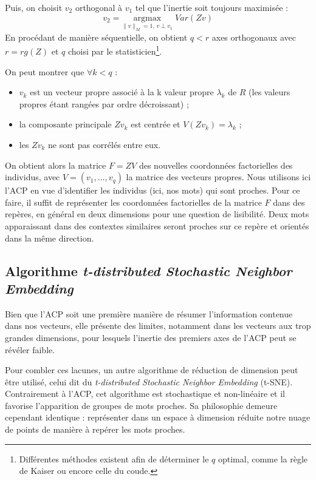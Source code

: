 \documentclass[11pt,french,french]{article}
\providecommand{\tightlist}{%
  \setlength{\parskip}{0pt}
  }
\let\rmarkdownfootnote\footnote%
\def\footnote{\protect\rmarkdownfootnote}
\begin{document}
Puis, on choisit \(v_2\) orthogonal à \(v_1\) tel que l'inertie soit
toujours maximisée : \[
v_2 =\underset{ \| v \|_M = 1,\,v \perp v_1}{\mathrm{argmax}}\;  Var(Zv)
\] En procédant de manière séquentielle, on obtient \(q < r\) axes
orthogonaux avec \(r = rg(Z)\) et \(q\) choisi par le
statisticien\footnote{Différentes méthodes existent afin de déterminer
  le \(q\) optimal, comme la règle de Kaiser ou encore celle du coude.}.

On peut montrer que \(\forall k < q\) :

\begin{itemize}
\tightlist
\item
  \(v_k\) est un vecteur propre associé à la k\ieme{} valeur propre
  \(\lambda_k\) de \(R\) (les valeurs propres étant rangées par ordre
  décroissant) ;
\item
  la composante principale \(Zv_k\) est centrée et
  \(V(Zv_k)= \lambda_k\) ;
\item
  les \(Zv_k\) ne sont pas corrélés entre eux.
\end{itemize}

On obtient alors la matrice \(F = ZV\) des nouvelles coordonnées
factorielles des individus, avec \(V = (v_1,\dots,v_q)\) la matrice des
vecteurs propres. Nous utilisons ici l'ACP en vue d'identifier les
individus (ici, nos mots) qui sont proches. Pour ce faire, il suffit de
représenter les coordonnées factorielles de la matrice \(F\) dans des
repères, en général en deux dimensions pour une question de lisibilité.
Deux mots apparaissant dans des contextes similaires seront proches sur
ce repère et orientés dans la même direction.

\subsection{\texorpdfstring{Algorithme \emph{t-distributed Stochastic
Neighbor
Embedding}}{Algorithme t-distributed Stochastic Neighbor Embedding}}\label{algorithme-t-distributed-stochastic-neighbor-embedding}

Bien que l'ACP soit une première manière de résumer l'information
contenue dans nos vecteurs, elle présente des limites, notamment dans
les vecteurs aux trop grandes dimensions, pour lesquels l'inertie des
premiers axes de l'ACP peut se révéler faible.

Pour combler ces lacunes, un autre algorithme de réduction de dimension
peut être utilisé, celui dit du \emph{t-distributed Stochastic Neighbor
Embedding} (t-SNE). Contrairement à l'ACP, cet algorithme est
stochastique et non-linéaire et il favorise l'apparition de groupes de
mots proches. Sa philosophie demeure cependant identique : représenter
dans un espace à dimension réduite notre nuage de points de manière à
repérer les mots proches.
\end{document}
